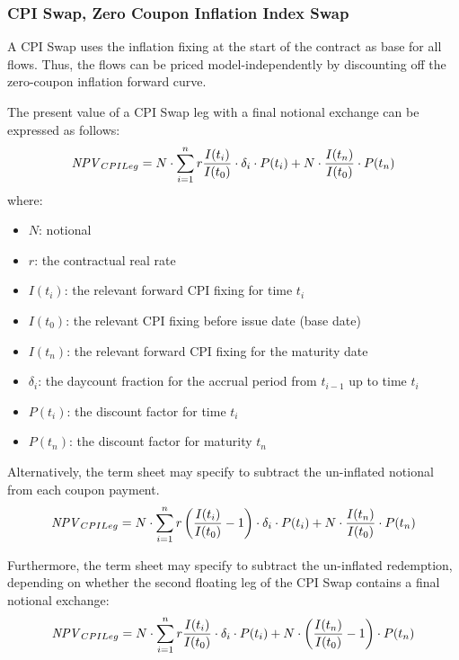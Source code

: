 \subsubsection{CPI Swap, Zero Coupon Inflation Index Swap}
\label{pricing:inf_zciis}

A CPI Swap uses the inflation fixing at the start of the contract as base for all 
flows. Thus, the flows can be priced model-independently by discounting off the 
zero-coupon inflation forward curve.  

The present value of a CPI Swap leg with a final notional exchange can be 
expressed as follows:
$$
\mathit{NPV}_{CPILeg} = N\cdot \sum_{i=1}^n r \frac{I(t_i)}{I(t_0)}\cdot \delta_i \cdot P(t_i) + N\cdot \frac{I(t_n)}{I(t_0)} \cdot P(t_n)
$$
where:
\begin{itemize}
\item $N$: notional
\item $r$: the contractual real rate
\item $I(t_i)$: the relevant forward CPI fixing for time $t_i$
\item $I(t_0)$: the relevant CPI fixing before issue date (base date)
\item $I(t_n)$: the relevant forward CPI fixing for the maturity date
\item $\delta_i$: the daycount fraction for the accrual period from 
$t_{i-1}$ up to time $t_i$
\item $P(t_i)$: the discount factor for time $t_i$
\item $P(t_n)$: the discount factor for maturity $t_n$
\end{itemize}


Alternatively, the term sheet may specify to subtract the un-inflated notional from each coupon payment.
$$
\mathit{NPV}_{CPILeg} = N\cdot \sum_{i=1}^n r \left(\frac{I(t_i)}{I(t_0)} - 1 \right) \cdot \delta_i \cdot P(t_i) + N\cdot \frac{I(t_n)}{I(t_0)} \cdot P(t_n)
$$

Furthermore, the term sheet may specify to subtract the un-inflated redemption,
depending on whether the second floating leg of the CPI Swap contains a final notional
exchange:
$$
\mathit{NPV}_{CPILeg} = N\cdot \sum_{i=1}^n r \frac{I(t_i)}{I(t_0)}\cdot \delta_i \cdot P(t_i) + N\cdot \left(\frac{I(t_n)}{I(t_0)} - 1\right) \cdot P(t_n)
$$
